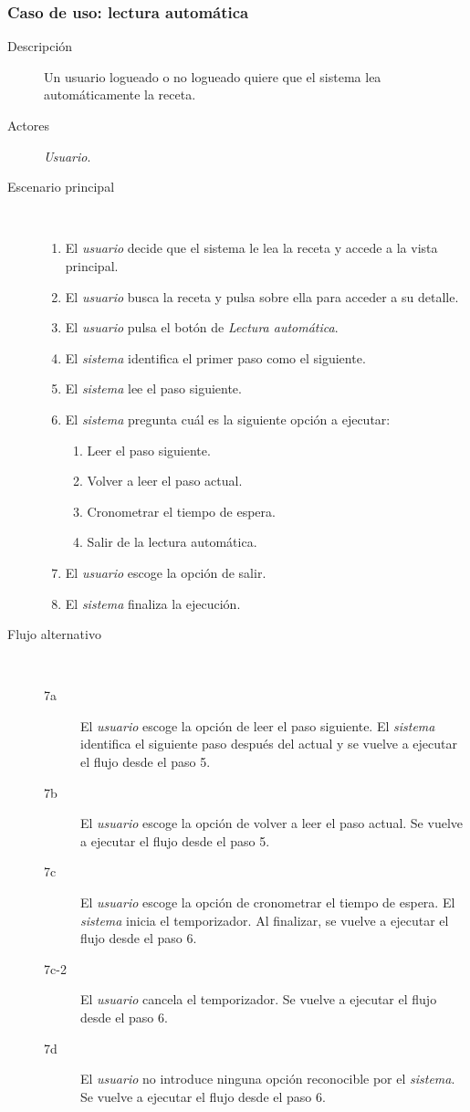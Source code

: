 \subsubsection{Caso de uso: lectura automática}

\begin{description}
\item[Descripción] Un usuario logueado o no logueado quiere que el sistema lea
automáticamente la receta.
\item[Actores] \textit{Usuario}.
\item[Escenario principal] $\quad$
  \begin{enumerate}
  \item El \textit{usuario} decide que el sistema le lea la receta y accede a
  la vista principal.
  \item El \textit{usuario} busca la receta y pulsa sobre ella para acceder a su
  detalle.
  \item El \textit{usuario} pulsa el botón de \textit{Lectura automática}.
  \item El \textit{sistema} identifica el primer paso como el siguiente.
  \item El \textit{sistema} lee el paso siguiente.
  \item El \textit{sistema} pregunta cuál es la siguiente opción a ejecutar:
  \begin{enumerate}
  \item Leer el paso siguiente.
  \item Volver a leer el paso actual.
  \item Cronometrar el tiempo de espera.
  \item Salir de la lectura automática.
  \end{enumerate}
  \item El \textit{usuario} escoge la opción de salir.
  \item El \textit{sistema} finaliza la ejecución.
  \end{enumerate}
\item[Flujo alternativo] $\quad$
  \begin{description}
  \item[7a] El \textit{usuario} escoge la opción de leer el paso siguiente. El
  \textit{sistema} identifica el siguiente paso después del actual y se vuelve
  a ejecutar el flujo desde el paso 5.
  \item[7b] El \textit{usuario} escoge la opción de volver a leer el paso actual.
  Se vuelve a ejecutar el flujo desde el paso 5.
  \item[7c] El \textit{usuario} escoge la opción de cronometrar el tiempo de
  espera. El \textit{sistema} inicia el temporizador. Al finalizar, se vuelve a
  ejecutar el flujo desde el paso 6.
  \item[7c-2] El \textit{usuario} cancela el temporizador. Se vuelve a ejecutar
  el flujo desde el paso 6.
  \item[7d] El \textit{usuario} no introduce ninguna opción reconocible por el
  \textit{sistema}. Se vuelve a ejecutar el flujo desde el paso 6.
  \end{description}

\end{description}




